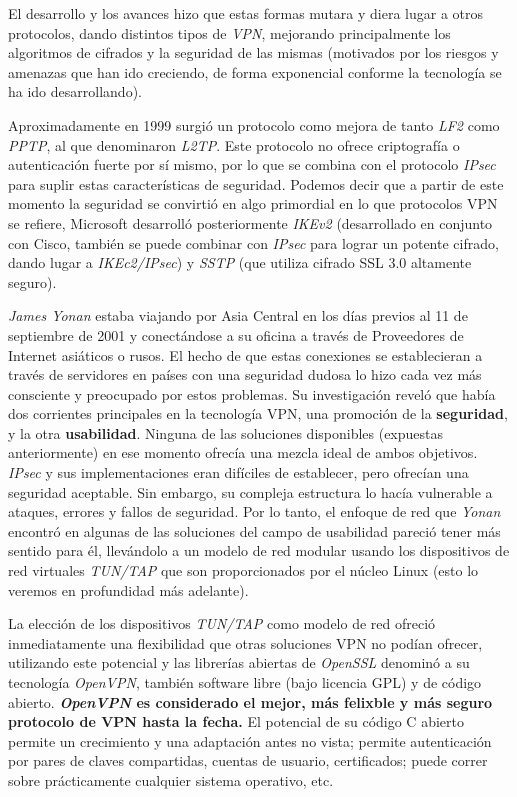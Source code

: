 \documentclass[a4paper, 11pt, titlepage]{article}
\begin{document}
    El desarrollo y los avances hizo que estas formas mutara y diera lugar a otros protocolos, dando 
    distintos tipos de \textit{VPN}, mejorando principalmente los algoritmos de cifrados y la 
    seguridad de las mismas (motivados por los riesgos y amenazas que han ido creciendo, de forma 
    exponencial conforme la tecnología se ha ido desarrollando). 

    Aproximadamente en 1999 surgió un protocolo como mejora de tanto \textit{LF2} como \textit{PPTP}, al 
    que denominaron \textit{L2TP}. Este protocolo no ofrece criptografía o autenticación fuerte por sí 
    mismo, por lo que se combina con el protocolo \textit{IPsec} para suplir estas características de 
    seguridad. Podemos decir que a partir de este momento la seguridad se convirtió en algo primordial
    en lo que protocolos VPN se refiere, Microsoft desarrolló posteriormente \textit{IKEv2} (desarrollado 
    en conjunto con Cisco, también se puede combinar con \textit{IPsec} para lograr un potente cifrado, 
    dando lugar a \textit{IKEc2/IPsec}) y \textit{SSTP} (que utiliza cifrado SSL 3.0 altamente seguro).

    \textit{James Yonan} estaba viajando por Asia Central en los días previos al 11 de septiembre de 2001 y conectándose
    a su oficina a través de Proveedores de Internet asiáticos o rusos. El hecho de que estas conexiones se 
    establecieran a través de servidores en países con una seguridad dudosa lo hizo cada vez más consciente y 
    preocupado por estos problemas. Su investigación reveló que había dos corrientes principales en la tecnología
    VPN, una promoción de la \textbf{seguridad}, y la otra \textbf{usabilidad}. Ninguna de las soluciones disponibles
    (expuestas anteriormente) en ese momento ofrecía una mezcla ideal de ambos objetivos. \textit{IPsec} y sus 
    implementaciones eran difíciles de establecer, pero ofrecían una seguridad aceptable. Sin embargo, su compleja
    estructura lo hacía vulnerable a ataques, errores y fallos de seguridad. Por lo tanto, el enfoque de red que 
    \textit{Yonan} encontró en algunas de las soluciones del campo de usabilidad pareció tener más sentido para él, 
    llevándolo a un modelo de red modular usando los dispositivos de red virtuales \textit{TUN/TAP} que son proporcionados 
    por el núcleo Linux (esto lo veremos en profundidad más adelante).

    La elección de los dispositivos \textit{TUN/TAP} como modelo de red ofreció inmediatamente una flexibilidad que otras 
    soluciones VPN no podían ofrecer, utilizando este potencial y las librerías abiertas de \textit{OpenSSL} denominó a 
    su tecnología \textit{OpenVPN}, también software libre (bajo licencia GPL) y de código abierto. \textbf{\textit{OpenVPN} es 
    considerado el mejor, más felixble y más seguro protocolo de VPN hasta la fecha.} El potencial de su código C abierto
    permite un crecimiento y una adaptación antes no vista; permite autenticación por pares de claves compartidas, cuentas
    de usuario, certificados; puede correr sobre prácticamente cualquier sistema operativo, etc.
\end{document}
